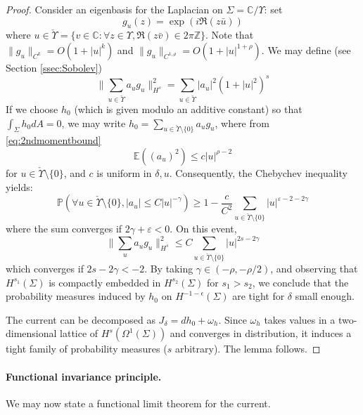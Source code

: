 \documentclass[10pt]{article}
\newcommand{\Z}{\mathbb{Z}}
\newcommand{\C}{\mathbb{C}}
\newcommand{\E}{\mathbb{E}}
\newcommand{\eps}{\varepsilon}
\renewcommand{\P}{\mathbb{P}}
\begin{document}
\begin{proof}
Consider an eigenbasis for the Laplacian on $\Sigma=\C/\Upsilon$: 
set
$$g_u(z)=\exp(i\Re(z\bar u))$$
where $u\in\check{\Upsilon}=\{v\in\C: \forall z\in\Upsilon,\Re(z\bar v)\in 2\pi\Z\}$. Note that $\|g_u\|_{C^k}=O(1+|u|^k)$ and $\|g_u\|_{C^{1,\rho}}=O(1+|u|^{1+\rho})$. We may define (see Section \ref{ssec:Sobolev})
$$\|\sum_{u\in\check{\Upsilon}} a_ug_u\|^2_{H^s}=\sum_{u\in\check{\Upsilon}} |a_u|^2(1+|u|^2)^s$$
If we choose $h_0$ (which is given modulo an additive constant) so that $\int_\Sigma h_0dA=0$, we may write $h_0=\sum_{u\in\check{\Upsilon}\setminus\{0\}}a_ug_u$, where from \eqref{eq:2ndmomentbound}
$$\E((a_u)^2)\leq c|u|^{\rho-2}$$
for ${u\in\check{\Upsilon}\setminus\{0\}}$, and $c$ is uniform in $\delta, u$. Consequently, the Chebychev inequality yields:
$$\P(\forall{u\in\check{\Upsilon}\setminus\{0\}}, |a_u|\leq C |u|^{-\gamma})\geq 1-\frac{c}{C^2}\sum_{u\in\check{\Upsilon}\setminus\{0\}}
|u|^{\eps-2-2\gamma}$$
where the sum converges if $2\gamma+\eps<0$. On this event, 
$$\|\sum_u a_ug_u\|^2_{H^s}\leq C\sum_{u\in\check{\Upsilon}\setminus\{0\}} |u|^{2s-2\gamma}$$
which converges if $2s-2\gamma<-2$. By taking $\gamma\in(-\rho,-\rho/2)$, and observing that $H^{s_1}(\Sigma)$ is compactly embedded in $H^{s_2}(\Sigma)$ for $s_1>s_2$,
we conclude that the probability measures induced by $h_0$ on $H^{-1-\epsilon}(\Sigma)$ are tight for $\delta$ small enough.

The current can be decomposed as $J_\delta=dh_0+\omega_h$. Since $\omega_h$ takes values in a two-dimensional lattice of $H^s(\Omega^1(\Sigma))$ and converges in distribution, it induces a tight family of probability measures ($s$ arbitrary). The lemma follows.


\end{proof}

\paragraph{Functional invariance principle.\\}

We may now state a functional limit theorem for the current.
\end{document}
